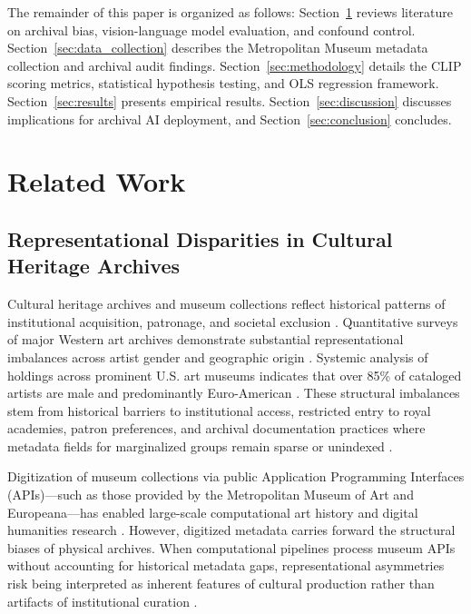 \documentclass[pdflatex,sn-mathphys-num]{sn-jnl}%
\theoremstyle{thmstyleone}%
\theoremstyle{thmstyletwo}%
\theoremstyle{thmstylethree}%
\begin{document}
The remainder of this paper is organized as follows: Section~\ref{sec:related_work} reviews literature on archival bias, vision-language model evaluation, and confound control. Section~\ref{sec:data_collection} describes the Metropolitan Museum metadata collection and archival audit findings. Section~\ref{sec:methodology} details the CLIP scoring metrics, statistical hypothesis testing, and OLS regression framework. Section~\ref{sec:results} presents empirical results. Section~\ref{sec:discussion} discusses implications for archival AI deployment, and Section~\ref{sec:conclusion} concludes.


\section{Related Work}
\label{sec:related_work}

\subsection{Representational Disparities in Cultural Heritage Archives}
Cultural heritage archives and museum collections reflect historical patterns of institutional acquisition, patronage, and societal exclusion \cite{carlson2022museum, meier2021gender, bailey2020gender}. Quantitative surveys of major Western art archives demonstrate substantial representational imbalances across artist gender and geographic origin \cite{topaz2019diversity}. Systemic analysis of holdings across prominent U.S. art museums indicates that over 85\% of cataloged artists are male and predominantly Euro-American \cite{topaz2019diversity}. These structural imbalances stem from historical barriers to institutional access, restricted entry to royal academies, patron preferences, and archival documentation practices where metadata fields for marginalized groups remain sparse or unindexed \cite{garcia2020bias, noorthuis2020bias}.

Digitization of museum collections via public Application Programming Interfaces (APIs)—such as those provided by the Metropolitan Museum of Art and Europeana—has enabled large-scale computational art history and digital humanities research \cite{fiorucci2020machine, met_api_2023}. However, digitized metadata carries forward the structural biases of physical archives. When computational pipelines process museum APIs without accounting for historical metadata gaps, representational asymmetries risk being interpreted as inherent features of cultural production rather than artifacts of institutional curation \cite{dignum2019responsible}.
\end{document}
